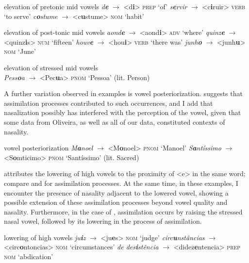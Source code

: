 \documentclass[output=paper,colorlinks,citecolor=brown]{langscibook}
\begin{document}
\largerpage
\ea\label{ex:6:11-2}elevation of pretonic mid vowels
        \ea\label{ex:6:11-2a} \emph{d\textbf{e}} $\rightarrow$ <d\textbf{i}> \textsc{prep} ‘of’
        \ex\label{ex:6:11-2b} \emph{s\textbf{e}rvir} $\rightarrow$ <c\textbf{i}ruir> \textsc{verb} ‘to serve’
        \ex\label{ex:6:11-2c} \emph{c\textbf{o}stume} $\rightarrow$ <c\textbf{u}stume> \textsc{nom} ‘habit’
    \z

    \ex \label{ex:6:12} elevation of post-tonic mid vowels
        \ea\label{ex:6:12a} \emph{aond\textbf{e}} $\rightarrow$ <aond\textbf{i}> \textsc{adv} ‘where’
        \ex\label{ex:6:12b} \emph{quinz\textbf{e}} $\rightarrow$ <quinz\textbf{i}s> \textsc{num} ‘fifteen’
        \ex\label{ex:6:12c} \emph{houv\textbf{e}} $\rightarrow$ <hou\textbf{i}> \textsc{verb} ‘there was’
        \ex\label{ex:6:12d} \emph{junh\textbf{o}} $\rightarrow$ <junh\textbf{u}> \textsc{nom} ‘June’
    \z  

    \ex\label{ex:6:13} elevation of stressed mid vowels\\
     \emph{Pess\textbf{o}a} $\rightarrow$ <Pec\textbf{u}a> \textsc{pnom} ‘Pessoa’ (lit. Person)        
\z

A further variation observed in examples  is vowel posteriorization. \citet[351]{Oliveira_2006} suggests that assimilation processes contributed to such occurrences, and I add that nasalization possibly has interfered with the perception of the vowel, given that some data from Oliveira, as well as all of our data, constituted contexts of nasality.

\ea\label{ex:6:14} vowel posteriorization
    \ea \emph{M\textbf{a}noel} $\rightarrow$ <M\textbf{o}noel> \textsc{pnom} ‘Manoel’ 
    \ex \emph{S\textbf{a}ntíssimo} $\rightarrow$ <S\textbf{o}mticimo> \textsc{pnom} ‘Santíssimo’ (lit. Sacred)
\z
\z

\citet[371]{Oliveira_2006} attributes the lowering of high vowels to the proximity of <e> in the same word; compare  and  for assimilation processes. At the same time, in these examples, I encounter the presence of nasality adjacent to the lowered vowel, showing a possible extension of these assimilation processes beyond vowel quality and nasality. Furthermore, in the case of , assimilation occurs by raising the stressed nasal vowel, followed by its lowering in the process of assimilation.

\ea\label{ex:6:15} lowering of high vowels
    \ea\label{ex:6:15a} \emph{ju\textbf{i}z} $\rightarrow$ <ju\textbf{e}s> \textsc{nom} ‘judge’
    \ex\label{ex:6:15b} \emph{circ\textbf{u}nstâncias} $\rightarrow$ <circ\textbf{o}ntoncias> \textsc{nom} ‘circumstances’
    \ex\label{ex:6:15c} \emph{de des\textbf{i}stência} $\rightarrow$ <didez\textbf{e}ntencia> \textsc{prep} \textsc{nom} ‘abdication’
    \z
\z
\end{document}
